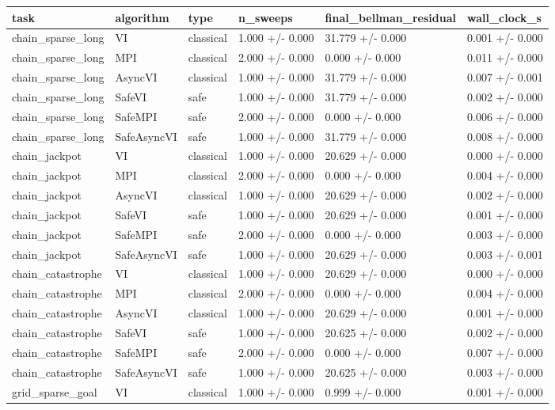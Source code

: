 \begin{tabular}{llllll}
\toprule
task & algorithm & type & n_sweeps & final_bellman_residual & wall_clock_s \\
\midrule
chain_sparse_long & VI & classical & 1.000 +/- 0.000 & 31.779 +/- 0.000 & 0.001 +/- 0.000 \\
chain_sparse_long & MPI & classical & 2.000 +/- 0.000 & 0.000 +/- 0.000 & 0.011 +/- 0.000 \\
chain_sparse_long & AsyncVI & classical & 1.000 +/- 0.000 & 31.779 +/- 0.000 & 0.007 +/- 0.001 \\
chain_sparse_long & SafeVI & safe & 1.000 +/- 0.000 & 31.779 +/- 0.000 & 0.002 +/- 0.000 \\
chain_sparse_long & SafeMPI & safe & 2.000 +/- 0.000 & 0.000 +/- 0.000 & 0.006 +/- 0.000 \\
chain_sparse_long & SafeAsyncVI & safe & 1.000 +/- 0.000 & 31.779 +/- 0.000 & 0.008 +/- 0.000 \\
chain_jackpot & VI & classical & 1.000 +/- 0.000 & 20.629 +/- 0.000 & 0.000 +/- 0.000 \\
chain_jackpot & MPI & classical & 2.000 +/- 0.000 & 0.000 +/- 0.000 & 0.004 +/- 0.000 \\
chain_jackpot & AsyncVI & classical & 1.000 +/- 0.000 & 20.629 +/- 0.000 & 0.002 +/- 0.000 \\
chain_jackpot & SafeVI & safe & 1.000 +/- 0.000 & 20.629 +/- 0.000 & 0.001 +/- 0.000 \\
chain_jackpot & SafeMPI & safe & 2.000 +/- 0.000 & 0.000 +/- 0.000 & 0.003 +/- 0.000 \\
chain_jackpot & SafeAsyncVI & safe & 1.000 +/- 0.000 & 20.629 +/- 0.000 & 0.003 +/- 0.001 \\
chain_catastrophe & VI & classical & 1.000 +/- 0.000 & 20.629 +/- 0.000 & 0.000 +/- 0.000 \\
chain_catastrophe & MPI & classical & 2.000 +/- 0.000 & 0.000 +/- 0.000 & 0.004 +/- 0.000 \\
chain_catastrophe & AsyncVI & classical & 1.000 +/- 0.000 & 20.629 +/- 0.000 & 0.001 +/- 0.000 \\
chain_catastrophe & SafeVI & safe & 1.000 +/- 0.000 & 20.625 +/- 0.000 & 0.002 +/- 0.000 \\
chain_catastrophe & SafeMPI & safe & 2.000 +/- 0.000 & 0.000 +/- 0.000 & 0.007 +/- 0.000 \\
chain_catastrophe & SafeAsyncVI & safe & 1.000 +/- 0.000 & 20.625 +/- 0.000 & 0.003 +/- 0.000 \\
grid_sparse_goal & VI & classical & 1.000 +/- 0.000 & 0.999 +/- 0.000 & 0.001 +/- 0.000 \\

\end{tabular}
